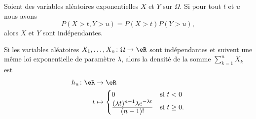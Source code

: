 \begin{proposition}	\label{PROPooXRMWooYjPMWN}
	Soient des variables aléatoires exponentielles \( X\) et \( Y\) sur \( \Omega\). Si pour tout \( t\) et \( u\) nous avons
	\begin{equation}
		P(X>t,Y>u)=P(X>t)P(Y>u),
	\end{equation}
	alors \( X\) et \( Y\) sont indépendantes.
\end{proposition}

\begin{proposition}	\label{PROPooBZREooUTvonZ}
	Si les variables aléatoires \(X_1,\ldots,X_n \colon \Omega\to \eR    \) sont indépendantes et suivent une même loi exponentielle de paramètre \( \lambda\), alors la densité de la somme \( \sum_{k=1}^nX_k \) est
	\begin{equation}		\label{EQooSCJHooUWxrgs}
		\begin{aligned}
			h_n\colon \eR & \to \eR                                                                                                                       \\
			t             & \mapsto \begin{cases}
				                        0                                                                                      & \text{si } t<0      \\
				                        \frac{ \displaystyle (\lambda t)^{n-1}\lambda e^{-\lambda t} }{ \displaystyle (n-1)! } & \text{si } t\geq 0.
			                        \end{cases}
		\end{aligned}
	\end{equation}
\end{proposition}

